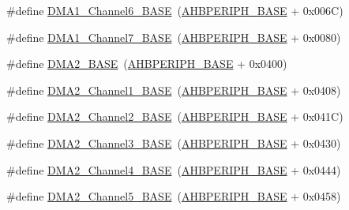 \begin{DoxyCompactItemize}
\item 
\#define \hyperlink{group___peripheral__memory__map_ga896c2c7585dd8bc3969cf8561f689d2d}{D\+M\+A1\+\_\+\+Channel6\+\_\+\+B\+A\+SE}~(\hyperlink{openmotestm_2library_2inc_2stm32f10x__map_8h_a92eb5d49730765d2abd0f5b09548f9f5}{A\+H\+B\+P\+E\+R\+I\+P\+H\+\_\+\+B\+A\+SE} + 0x006\+C)
\item 
\#define \hyperlink{group___peripheral__memory__map_gaeee0d1f77d0db1db533016a09351166c}{D\+M\+A1\+\_\+\+Channel7\+\_\+\+B\+A\+SE}~(\hyperlink{openmotestm_2library_2inc_2stm32f10x__map_8h_a92eb5d49730765d2abd0f5b09548f9f5}{A\+H\+B\+P\+E\+R\+I\+P\+H\+\_\+\+B\+A\+SE} + 0x0080)
\item 
\#define \hyperlink{group___peripheral__memory__map_gab72a9ae145053ee13d1d491fb5c1df64}{D\+M\+A2\+\_\+\+B\+A\+SE}~(\hyperlink{openmotestm_2library_2inc_2stm32f10x__map_8h_a92eb5d49730765d2abd0f5b09548f9f5}{A\+H\+B\+P\+E\+R\+I\+P\+H\+\_\+\+B\+A\+SE} + 0x0400)
\item 
\#define \hyperlink{group___peripheral__memory__map_gad3bd6c4201d12f5d474518c1b02f8e3b}{D\+M\+A2\+\_\+\+Channel1\+\_\+\+B\+A\+SE}~(\hyperlink{openmotestm_2library_2inc_2stm32f10x__map_8h_a92eb5d49730765d2abd0f5b09548f9f5}{A\+H\+B\+P\+E\+R\+I\+P\+H\+\_\+\+B\+A\+SE} + 0x0408)
\item 
\#define \hyperlink{group___peripheral__memory__map_ga22f39f23c879c699b88e04a629f69d1c}{D\+M\+A2\+\_\+\+Channel2\+\_\+\+B\+A\+SE}~(\hyperlink{openmotestm_2library_2inc_2stm32f10x__map_8h_a92eb5d49730765d2abd0f5b09548f9f5}{A\+H\+B\+P\+E\+R\+I\+P\+H\+\_\+\+B\+A\+SE} + 0x041\+C)
\item 
\#define \hyperlink{group___peripheral__memory__map_ga6f2369b8bc155fb55a28891987605c2c}{D\+M\+A2\+\_\+\+Channel3\+\_\+\+B\+A\+SE}~(\hyperlink{openmotestm_2library_2inc_2stm32f10x__map_8h_a92eb5d49730765d2abd0f5b09548f9f5}{A\+H\+B\+P\+E\+R\+I\+P\+H\+\_\+\+B\+A\+SE} + 0x0430)
\item 
\#define \hyperlink{group___peripheral__memory__map_ga01b063266473f290a55047654fbbfbee}{D\+M\+A2\+\_\+\+Channel4\+\_\+\+B\+A\+SE}~(\hyperlink{openmotestm_2library_2inc_2stm32f10x__map_8h_a92eb5d49730765d2abd0f5b09548f9f5}{A\+H\+B\+P\+E\+R\+I\+P\+H\+\_\+\+B\+A\+SE} + 0x0444)
\item 
\#define \hyperlink{group___peripheral__memory__map_ga1eea983a5d68bf36f4d19fbb07955ca1}{D\+M\+A2\+\_\+\+Channel5\+\_\+\+B\+A\+SE}~(\hyperlink{openmotestm_2library_2inc_2stm32f10x__map_8h_a92eb5d49730765d2abd0f5b09548f9f5}{A\+H\+B\+P\+E\+R\+I\+P\+H\+\_\+\+B\+A\+SE} + 0x0458)
\item 

\end{DoxyCompactItemize}
